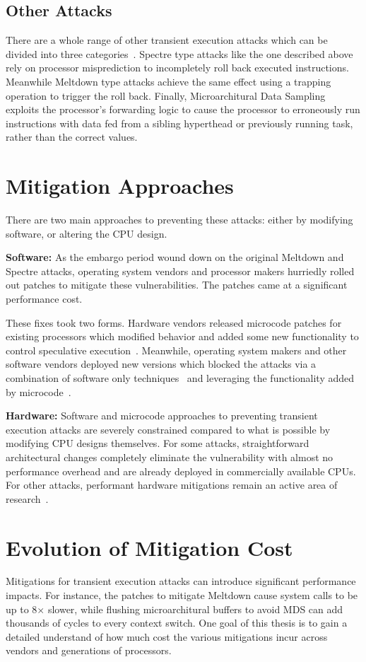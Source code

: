 \subsection{Other Attacks}
There are a whole range of other transient execution attacks which can be divided into three categories~\cite{hill:survey}.
Spectre type attacks like the one described above rely on processor misprediction to incompletely roll back executed instructions.
Meanwhile Meltdown type attacks achieve the same effect using a trapping operation to trigger the roll back.
Finally, Microarchitural Data Sampling exploits the processor's forwarding logic to cause the processor to erroneously run instructions with data fed from a sibling hyperthead or previously running task, rather than the correct values.

\section{Mitigation Approaches}

There are two main approaches to preventing these attacks: either by modifying software, or altering the CPU design.

\noindent\textbf{Software:}
As the embargo period wound down on the original Meltdown and Spectre attacks, operating system vendors and processor makers hurriedly rolled out patches to mitigate these vulnerabilities.
The patches came at a significant performance cost. 

These fixes took two forms.
Hardware vendors released microcode patches for existing processors which modified behavior and added some new functionality to control speculative execution~\cite{intel:l1tf}.
Meanwhile, operating system makers and other software vendors deployed new versions which blocked the attacks via a combination of software only techniques~\cite{intel:retpoline, linux:kpti} and leveraging the functionality added by microcode~\cite{intel:l1tf}.

\noindent\textbf{Hardware:}
Software and microcode approaches to preventing transient execution attacks are severely constrained compared to what is possible by modifying CPU designs themselves.
For some attacks, straightforward architectural changes completely eliminate the vulnerability with almost no performance overhead and are already deployed in commercially available CPUs.
For other attacks, performant hardware mitigations remain an active area of research~\cite{OISA, ConTExT}.

\section{Evolution of Mitigation Cost}
Mitigations for transient execution attacks can introduce significant performance impacts.
For instance, the patches to mitigate Meltdown cause system calls to be up to 8$\times$ slower, while flushing microarchitural buffers to avoid MDS can add thousands of cycles to every context switch.
One goal of this thesis is to gain a detailed understand of how much cost the various mitigations incur across vendors and generations of processors.

